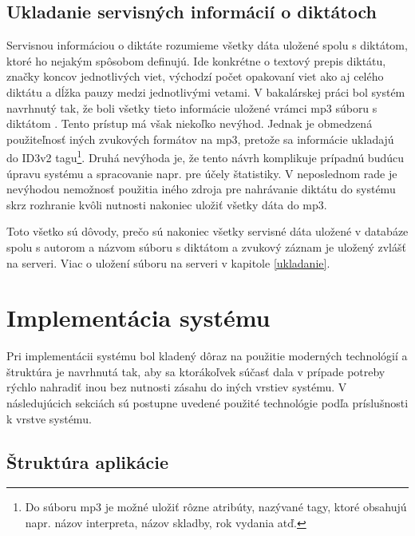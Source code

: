 \documentclass[12pt,oneside]{fithesis2}
\begin{document}
	\section{Ukladanie servisných informácií o diktátoch}
	\par Servisnou informáciou o diktáte rozumieme všetky dáta uložené spolu s diktátom, ktoré ho nejakým spôsobom definujú. Ide konkrétne o textový prepis diktátu, značky koncov jednotlivých viet, východzí počet opakovaní viet ako aj celého diktátu a dĺžka pauzy medzi jednotlivými vetami. V bakalárskej práci bol systém navrhnutý tak, že boli všetky tieto informácie uložené vrámci mp3 súboru s diktátom \cite{rumanov12}. Tento prístup má však niekoľko nevýhod. Jednak je obmedzená použiteľnosť iných zvukových formátov na mp3, pretože sa informácie ukladajú do ID3v2 tagu\footnote{Do súboru mp3 je možné uložiť rôzne atribúty, nazývané tagy, ktoré obsahujú napr. názov interpreta, názov skladby, rok vydania atď.}. Druhá nevýhoda je, že tento návrh komplikuje prípadnú budúcu úpravu systému a spracovanie napr. pre účely štatistiky. V neposlednom rade je nevýhodou nemožnosť použitia iného zdroja pre nahrávanie diktátu do systému skrz rozhranie kvôli nutnosti nakoniec uložiť všetky dáta do mp3.
	\par Toto všetko sú dôvody, prečo sú nakoniec všetky servisné dáta uložené v databáze spolu s autorom a názvom súboru s diktátom a zvukový záznam je uložený zvlášť na serveri. Viac o uložení súboru na serveri v kapitole \ref{ukladanie}.
	
    \chapter{Implementácia systému}
    
    \par Pri implementácii systému bol kladený dôraz na použitie moderných technológií a štruktúra je navrhnutá tak, aby sa ktorákoľvek súčasť dala v prípade potreby rýchlo nahradiť inou bez nutnosti zásahu do iných vrstiev systému. V následujúcich sekciách sú postupne uvedené použité technológie podľa príslušnosti k vrstve systému.
      \section{Štruktúra aplikácie}
\end{document}
